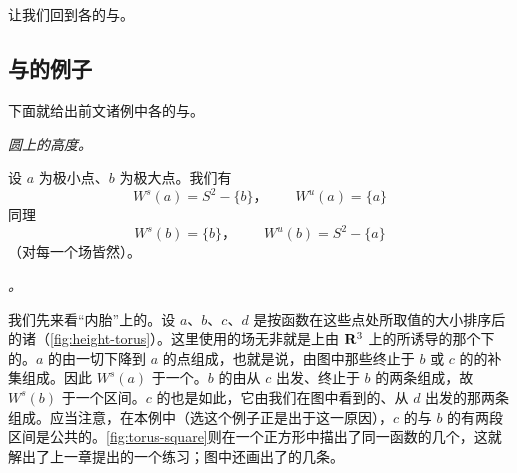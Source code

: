 
\section{\trSmaleCondition}
\label{sec:the-smale-condition}

让我们回到各\trCriticalPoint{}的\trStableManifold{}与\trUnstableManifold。

\subsection{\trStableManifold{}与\trUnstableManifold{}的例子}
\label{subsec:examples-stable-unstable}

下面就给出前文诸例中各\trCriticalPoint{}的\trStableManifold{}与\trUnstableManifold。

\emph{圆\trSphere{}上的高度。}

设 $a$ 为极小点、$b$ 为极大点。我们有
\[
W^s(a)=S^2-\{b\}\text{，}\qquad W^u(a)=\{a\}
\]
同理
\[
W^s(b)=\{b\}\text{，}\qquad W^u(b)=S^2-\{a\}
\]
（对每一个\trPseudogradient{}场皆然）。

\emph{\trTorus。}

我们先来看“内胎”\trTorus{}上的\trHeightFunction。设 $a$、$b$、$c$、$d$ 是按函数在这些点处所取值的大小排序后的诸\trCriticalPoint（\cref{fig:height-torus}）。这里使用的\trPseudogradient{}场无非就是\trTorus{}上由 $\mathbf{R}^3$ 上的\trMetric{}所诱导的那个\trMetric{}下的\trGradient。$a$ 的\trStableManifold{}由一切下降到 $a$ 的点组成，也就是说，由图中那些终止于 $b$ 或 $c$ 的\trTrajectory{}的补集组成。因此 $W^s(a)$ \trHomeomorphic{}于一个\trOpen{}\trDisk。$b$ 的\trStableManifold{}由从 $c$ 出发、终止于 $b$ 的两条\trTrajectory{}组成，故 $W^s(b)$ \trDiffeomorphic{}于一个\trOpen{}区间。$c$ 的\trStableManifold{}也是如此，它由我们在图中看到的、从 $d$ 出发的那两条\trTrajectory{}组成。应当注意，在本例中（选这个例子正是出于这一原因），$c$ 的\trUnstableManifold{}与 $b$ 的\trStableManifold{}有两段\trOpen{}区间是公共的。\cref{fig:torus-square}则在一个正方形中描出了同一函数的几个\trLevelSet，这就解出了上一章提出的一个练习；图中还画出了\trGradient{}的几条\trTrajectory。

